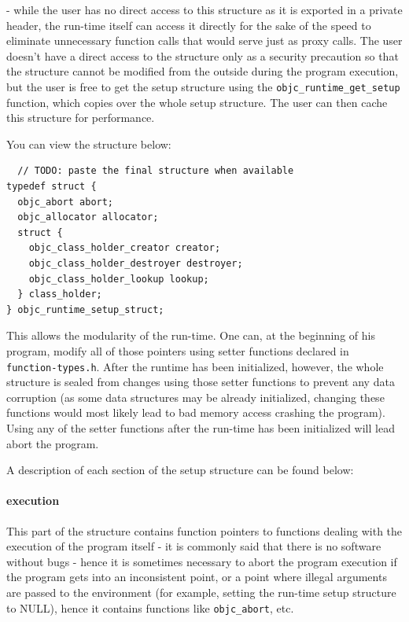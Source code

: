 - while the user has no direct access to this structure as it is exported in a private header, the run-time itself can access it directly for the sake of the speed to eliminate unnecessary function calls that would serve just as proxy calls. The user doesn't have a direct access to the structure only as a security precaution so that the structure cannot be modified from the outside during the program execution, but the user is free to get the setup structure using the \verb=objc_runtime_get_setup= function, which copies over the whole setup structure. The user can then cache this structure for performance.

You can view the structure below:

\begin{verbatim}
  // TODO: paste the final structure when available
typedef struct {
  objc_abort abort;
  objc_allocator allocator;
  struct {
    objc_class_holder_creator creator;
    objc_class_holder_destroyer destroyer;
    objc_class_holder_lookup lookup;
  } class_holder;
} objc_runtime_setup_struct;
\end{verbatim}

This allows the modularity of the run-time. One can, at the beginning of his program, modify all of those pointers using setter functions declared in \verb=function-types.h=. After the runtime has been initialized, however, the whole structure is sealed from changes using those setter functions to prevent any data corruption (as some data structures may be already initialized, changing these functions would most likely lead to bad memory access crashing the program). Using any of the setter functions after the run-time has been initialized will lead abort the program.

A description of each section of the setup structure can be found below:

\paragraph{execution}

This part of the structure contains function pointers to functions dealing with the execution of the program itself - it is commonly said that there is no software without bugs - hence it is sometimes necessary to abort the program execution if the program gets into an inconsistent point, or a point where illegal arguments are passed to the environment (for example, setting the run-time setup structure to NULL), hence it contains functions like \verb=objc_abort=, etc.


